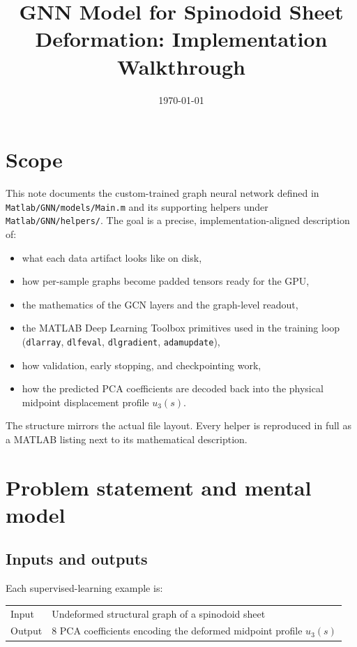 \documentclass[11pt]{article}
\title{GNN Model for Spinodoid Sheet Deformation:
       Implementation Walkthrough}
\author{}
\date{\today}
\begin{document}
\maketitle
\tableofcontents
\vspace{1em}

\section{Scope}

This note documents the custom-trained graph neural network defined in
\texttt{Matlab/GNN/models/Main.m} and its supporting helpers under
\texttt{Matlab/GNN/helpers/}. The goal is a precise, implementation-aligned
description of:

\begin{itemize}
  \item what each data artifact looks like on disk,
  \item how per-sample graphs become padded tensors ready for the GPU,
  \item the mathematics of the GCN layers and the graph-level readout,
  \item the MATLAB Deep Learning Toolbox primitives used in the training loop
        (\texttt{dlarray}, \texttt{dlfeval}, \texttt{dlgradient},
        \texttt{adamupdate}),
  \item how validation, early stopping, and checkpointing work,
  \item how the predicted PCA coefficients are decoded back into the physical
        midpoint displacement profile $u_3(s)$.
\end{itemize}

\noindent
The structure mirrors the actual file layout. Every helper is reproduced in
full as a MATLAB listing next to its mathematical description.

\section{Problem statement and mental model}

\subsection{Inputs and outputs}

Each supervised-learning example is:

\begin{center}
\begin{tabular}{ll}
\toprule
Input  & Undeformed structural graph of a spinodoid sheet \\
Output & $8$ PCA coefficients encoding the deformed midpoint profile $u_3(s)$ \\
\bottomrule
\end{tabular}
\end{center}
\end{document}
